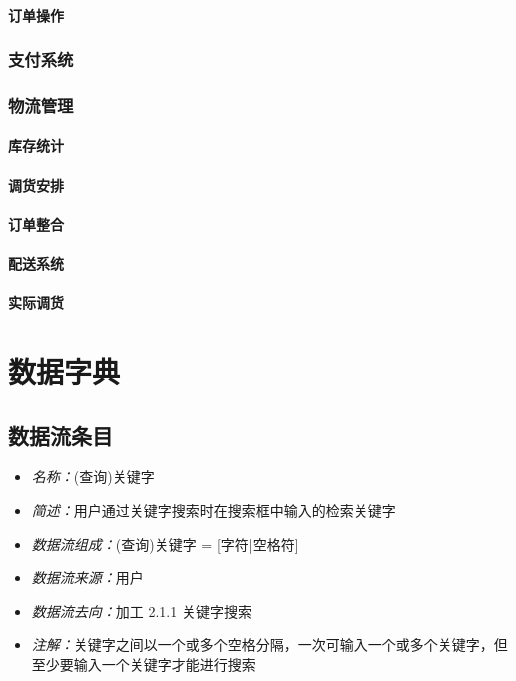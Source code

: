 \paragraph{订单操作}
\subsubsection{支付系统}
\subsubsection{物流管理}
\paragraph{库存统计}
\paragraph{调货安排}
\paragraph{订单整合}
\paragraph{配送系统}
\paragraph{实际调货}
\section{数据字典}
\subsection{数据流条目}

\begin{itemize}
	\item \textit{名称：}(查询)关键字
	\item \textit{简述：}用户通过关键字搜索时在搜索框中输入的检索关键字
	\item \textit{数据流组成：}(查询)关键字 = [字符|空格符]
	\item \textit{数据流来源：}用户
	\item \textit{数据流去向：}加工 2.1.1 关键字搜索
	\item \textit{注解：}关键字之间以一个或多个空格分隔，一次可输入一个或多个关键字，但至少要输入一个关键字才能进行搜索
\end{itemize}

